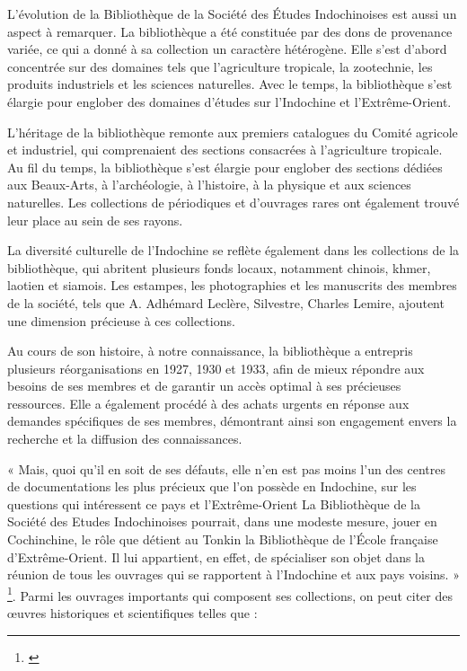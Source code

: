 L'évolution de la Bibliothèque de la Société des Études Indochinoises est aussi un aspect à remarquer. La bibliothèque a été constituée par des dons de provenance variée, ce qui a donné à sa collection un caractère hétérogène. Elle s'est d'abord concentrée sur des domaines tels que l'agriculture tropicale, la zootechnie, les produits industriels et les sciences naturelles. Avec le temps, la bibliothèque s'est élargie pour englober des domaines d'études sur l'Indochine et l'Extrême-Orient.

L'héritage de la bibliothèque remonte aux premiers catalogues du Comité agricole et industriel, qui comprenaient des sections consacrées à l'agriculture tropicale. Au fil du temps, la bibliothèque s'est élargie pour englober des sections dédiées aux Beaux-Arts, à l'archéologie, à l'histoire, à la physique et aux sciences naturelles. Les collections de périodiques et d'ouvrages rares ont également trouvé leur place au sein de ses rayons.

La diversité culturelle de l'Indochine se reflète également dans les collections de la bibliothèque, qui abritent plusieurs fonds locaux, notamment chinois, khmer, laotien et siamois. Les estampes, les photographies et les manuscrits des membres de la société, tels que A. Adhémard Leclère, Silvestre, Charles Lemire, ajoutent une dimension précieuse à ces collections.

Au cours de son histoire, à notre connaissance, la bibliothèque a entrepris plusieurs réorganisations en 1927, 1930 et 1933, afin de mieux répondre aux besoins de ses membres et de garantir un accès optimal à ses précieuses ressources. Elle a également procédé à des achats urgents en réponse aux demandes spécifiques de ses membres, démontrant ainsi son engagement envers la recherche et la diffusion des connaissances.

« Mais, quoi qu'il en soit de ses défauts, elle n'en est pas moins l’un des centres de documentations les plus précieux que l'on possède en Indochine, sur les questions qui intéressent ce pays et l'Extrême-Orient La Bibliothèque de la Société des Etudes Indochinoises pourrait, dans une modeste mesure, jouer en Cochinchine, le rôle que détient au Tonkin la Bibliothèque de l'École française d’Extrême-Orient. Il lui appartient, en effet, de spécialiser son objet dans la réunion de tous les ouvrages qui se rapportent à l'Indochine et aux pays voisins. » \footnote{\cite{bilo}}. Parmi les ouvrages importants qui composent ses collections, on peut citer des œuvres historiques et scientifiques telles que :

